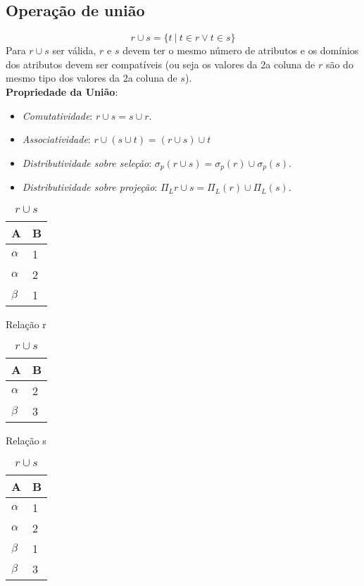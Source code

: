 \documentclass{article}
\begin{document}
\subsection{Operação de união}
\[
  r \cup s = \{t \ | \ t \in r \vee t \in s\}
\]
Para $r \cup s$ ser válida, $r$ e $s$ devem ter o mesmo número de atributos e os domínios dos atributos devem ser compatíveis (ou seja os valores da 2a coluna de $r$ são do mesmo tipo dos valores da 2a coluna de $s$). \\
\textbf{Propriedade da União}:
\begin{itemize}
  \item \textit{Comutatividade}: $r\cup s = s \cup r$.
  \item \textit{Associatividade}: $r \cup (s \cup t) = (r \cup s) \cup t$
  \item \textit{Distributividade sobre seleção}: $\sigma_p(r \cup s)= \sigma_p(r) \cup \sigma_p(s)$.
  \item \textit{Distributividade sobre projeção}: $\Pi_L{r \cup s} = \Pi_L(r) \cup \Pi_L(s)$.
\end{itemize}

\begin{table}[ht]
  \parbox{.30\linewidth}{
    \centering
    \begin{tabular}{|l|l|}
      \hline
      A        & B \\ \hline
      $\alpha$ & 1 \\ \hline
      $\alpha$ & 2 \\ \hline
      $\beta$  & 1 \\ \hline
    \end{tabular}
    \caption{Relação r}
  }
  \hfill
  \parbox{.30\linewidth}{
    \centering
    \begin{tabular}{|l|l|}
      \hline
      A        & B \\ \hline
      $\alpha$ & 2 \\ \hline
      $\beta$  & 3 \\ \hline
    \end{tabular}
    \caption{Relação s}
  }
  \hfill
  \parbox{.30\linewidth}{
    \centering
    \begin{tabular}{|l|l|}
      \hline
      A        & B \\ \hline
      $\alpha$ & 1 \\ \hline
      $\alpha$ & 2 \\ \hline
      $\beta$  & 1 \\ \hline
      $\beta$  & 3 \\ \hline
    \end{tabular}
    \caption{$r \cup s$}
  }
\end{table}
\end{document}
